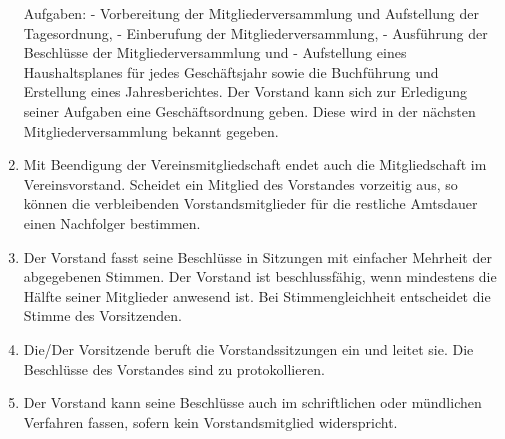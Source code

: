 \documentclass[12pt]{article}
\begin{document}
\begin{enumerate}[label=(\arabic*)]
	      Aufgaben:
	      - Vorbereitung der Mitgliederversammlung und Aufstellung der Tagesordnung,
	      - Einberufung der Mitgliederversammlung,
	      - Ausführung der Beschlüsse der Mitgliederversammlung und
	      - Aufstellung eines Haushaltsplanes für jedes Geschäftsjahr sowie die Buchführung und Erstellung
	      eines Jahresberichtes.
	      Der Vorstand kann sich zur Erledigung seiner Aufgaben eine Geschäftsordnung geben. Diese wird in
	      der nächsten Mitgliederversammlung bekannt gegeben.
	\item Mit Beendigung der Vereinsmitgliedschaft endet auch die Mitgliedschaft im Vereinsvorstand.
	      Scheidet ein Mitglied des Vorstandes vorzeitig aus, so können die verbleibenden Vorstandsmitglieder
	      für die restliche Amtsdauer einen Nachfolger bestimmen.
	\item Der Vorstand fasst seine Beschlüsse in Sitzungen mit einfacher Mehrheit der abgegebenen
	      Stimmen. Der Vorstand ist beschlussfähig, wenn mindestens die Hälfte seiner Mitglieder anwesend
	      ist. Bei Stimmengleichheit entscheidet die Stimme des Vorsitzenden.
	\item Die/Der Vorsitzende beruft die Vorstandssitzungen ein und leitet sie. Die Beschlüsse des
	      Vorstandes sind zu protokollieren.
	\item Der Vorstand kann seine Beschlüsse auch im schriftlichen oder mündlichen Verfahren fassen,
	      sofern kein Vorstandsmitglied widerspricht.
\end{enumerate}
\end{document}
